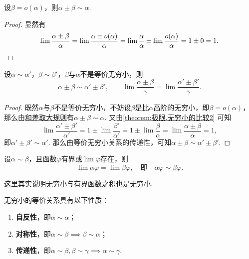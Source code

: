 \begin{theorem}[和差取大规则]\label{theorem:极限.无穷小的比较3}
设\(\beta=o(\alpha)\)，则\(\alpha\pm\beta\sim\alpha\).
\begin{proof}
显然有\[
\lim \frac{\alpha\pm\beta}{\alpha}
= \lim \frac{\alpha\pm o(\alpha)}{\alpha}
= \lim \frac{\alpha}{\alpha} \pm \lim \frac{o(\alpha)}{\alpha}
= 1 \pm 0 = 1.
\qedhere
\]
\end{proof}
\end{theorem}

\begin{theorem}[和差代替规则]\label{theorem:极限.无穷小的比较4}
设\(\alpha\sim\alpha'\)，\(\beta\sim\beta'\)，\(\beta\)与\(\alpha\)不是等价无穷小，则\[
\alpha\pm\beta\sim\alpha'\pm\beta',
\qquad
\lim \frac{\alpha\pm\beta}{\gamma} = \lim \frac{\alpha'\pm\beta'}{\gamma}.
\]
\begin{proof}
既然\(\alpha\)与\(\beta\)不是等价无穷小，不妨设\(\beta\)是比\(\alpha\)高阶的无穷小，即\(\beta = o(\alpha)\)，那么由\hyperref[theorem:极限.无穷小的比较3]{和差取大规则}有\(\alpha\pm\beta \sim \alpha\).
又由\cref{theorem:极限.无穷小的比较2} 可知\[
\lim \frac{\alpha'\pm\beta'}{\alpha'}
= 1 \pm \lim \frac{\beta'}{\alpha'}
= 1 \pm \lim \frac{\beta}{\alpha}
= \lim \frac{\alpha\pm\beta}{\alpha}
= 1,
\]即\(\alpha'\pm\beta' \sim \alpha'\).
那么由等价无穷小关系的传递性，可知\(\alpha\pm\beta \sim \alpha'\pm\beta'\).
\end{proof}
\end{theorem}

\begin{theorem}[因式代替规则]\label{theorem:极限.无穷小的比较5}
设\(\alpha\sim\beta\)，且函数\(\varphi\)有界或\(\lim\varphi\)存在，则\[
\lim \alpha \varphi = \lim \beta \varphi,
\quad\text{即}\quad
\alpha \varphi \sim \beta \varphi.
\]
\end{theorem}
这里其实说明无穷小与有界函数之积也是无穷小.

\begin{property}\label{theorem:极限.无穷小的比较6}
无穷小的等价关系具有以下性质：
\begin{enumerate}
\item \textbf{自反性}，即\(\alpha \sim \alpha\)；
\item \textbf{对称性}，即\(\alpha \sim \beta \implies \beta \sim \alpha\)；
\item \textbf{传递性}，即\(\alpha \sim \beta, \beta \sim \gamma \implies \alpha \sim \gamma\).
\end{enumerate}
\end{property}

